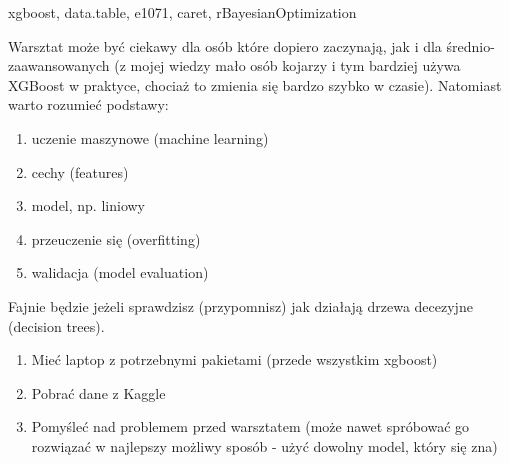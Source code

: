\documentclass[\main/boa.tex]{subfiles}
\begin{document}
\pakiety xgboost, data.table, e1071, caret, rBayesianOptimization

\umiejetnosci Warsztat może być ciekawy dla osób które dopiero zaczynają, jak i dla średnio-zaawansowanych (z mojej wiedzy mało osób kojarzy i tym bardziej używa XGBoost w praktyce, chociaż to zmienia się bardzo szybko w czasie).
Natomiast warto rozumieć podstawy:
\begin{enumerate}
	\item uczenie maszynowe (machine learning)
	\item cechy (features)
	\item model, np. liniowy
	\item przeuczenie się (overfitting)
	\item walidacja (model evaluation)
\end{enumerate}
Fajnie będzie jeżeli sprawdzisz (przypomnisz) jak działają drzewa decezyjne (decision trees).

\wymagania 
\begin{enumerate}
\item Mieć laptop z potrzebnymi pakietami (przede wszystkim xgboost)
\item Pobrać dane z Kaggle
\item Pomyśleć nad problemem przed warsztatem (może nawet spróbować go rozwiązać w najlepszy możliwy sposób - użyć dowolny model, który się zna)
\end{enumerate}
\end{document}
